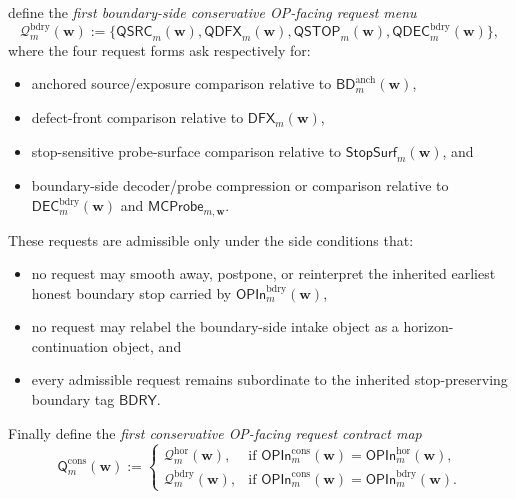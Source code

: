 \begin{definition}
\begin{enumerate}[label=(\roman*)]
\[  \]
  define the \emph{first boundary-side conservative OP-facing request menu}
  \[
    \mathcal Q^{\mathrm{bdry}}_{m}(\mathbf w)
    :=
    \{\mathsf{QSRC}_{m}(\mathbf w),\mathsf{QDFX}_{m}(\mathbf w),\mathsf{QSTOP}_{m}(\mathbf w),\mathsf{QDEC}^{\mathrm{bdry}}_{m}(\mathbf w)\},
  \]
  where the four request forms ask respectively for:
  \begin{itemize}[leftmargin=2em]
    \item anchored source/exposure comparison relative to \(\mathsf{BD}^{\mathrm{anch}}_{m}(\mathbf w)\),
    \item defect-front comparison relative to \(\mathsf{DFX}_{m}(\mathbf w)\),
    \item stop-sensitive probe-surface comparison relative to \(\mathsf{StopSurf}_{m}(\mathbf w)\), and
    \item boundary-side decoder/probe compression or comparison relative to \(\mathsf{DEC}^{\mathrm{bdry}}_{m}(\mathbf w)\) and \(\mathsf{MCProbe}_{m,\mathbf w}\).
  \end{itemize}
  These requests are admissible only under the side conditions that:
  \begin{itemize}[leftmargin=2em]
    \item no request may smooth away, postpone, or reinterpret the inherited earliest honest boundary stop carried by \(\mathsf{OPIn}^{\mathrm{bdry}}_{m}(\mathbf w)\),
    \item no request may relabel the boundary-side intake object as a horizon-continuation object, and
    \item every admissible request remains subordinate to the inherited stop-preserving boundary tag \(\mathsf{BDRY}\).
  \end{itemize}
\end{enumerate}
Finally define the \emph{first conservative OP-facing request contract map}
\[
  \mathsf{Q}^{\mathrm{cons}}_{m}(\mathbf w)
  :=
  \begin{cases}
    \mathcal Q^{\mathrm{hor}}_{m}(\mathbf w), & \text{if }\mathsf{OPIn}^{\mathrm{cons}}_{m}(\mathbf w)=\mathsf{OPIn}^{\mathrm{hor}}_{m}(\mathbf w),\\[2mm]
    \mathcal Q^{\mathrm{bdry}}_{m}(\mathbf w), & \text{if }\mathsf{OPIn}^{\mathrm{cons}}_{m}(\mathbf w)=\mathsf{OPIn}^{\mathrm{bdry}}_{m}(\mathbf w).
  \end{cases}
\]
\end{definition}

